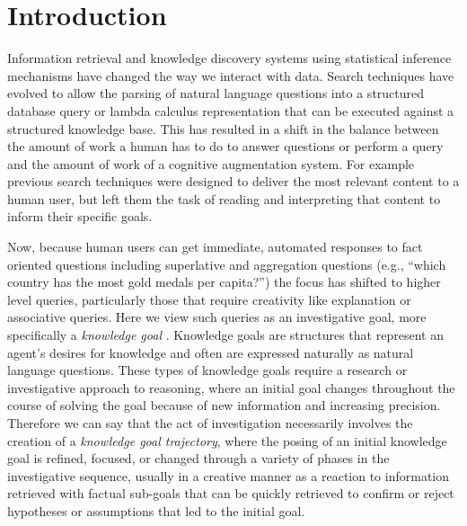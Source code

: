 \documentclass{llncs}
\begin{document}
\section{Introduction}
%
Information retrieval and knowledge discovery systems using statistical inference mechanisms have changed the way we interact with data. Search techniques have evolved to allow the parsing of natural language questions into a structured database query \cite{yahya_natural_2012} or lambda calculus representation \cite{berant_semantic_2013} that can be executed against a structured knowledge base. This has resulted in a shift in the balance between the amount of work a human has to do to answer questions or perform a query and the amount of work of a cognitive augmentation system. For example previous search techniques were designed to deliver the most relevant content to a human user, but left them the task of reading and interpreting that content to inform their specific goals.

	Now, because human users can get immediate, automated responses to fact oriented questions including superlative and aggregation questions (e.g., ``which country has the most gold medals per capita?'') the focus has shifted to higher level queries, particularly those that require creativity like explanation or associative queries. Here we view such queries as an investigative goal, more specifically a \textit{knowledge goal} \cite{bengfort_interactive_2015,ram_1990,ram_1991}. Knowledge goals are structures that represent an agent's desires for knowledge and often are expressed naturally as natural language questions. These types of knowledge goals require a research or investigative approach to reasoning, where an initial goal changes throughout the course of solving the goal because of new information and increasing precision. Therefore we can say that the act of investigation necessarily involves the creation of a \textit{knowledge goal trajectory}, where the posing of an initial knowledge goal is refined, focused, or changed through a variety of phases in the investigative sequence, usually in a creative manner as a reaction to information retrieved with factual sub-goals that can be quickly retrieved to confirm or reject hypotheses or assumptions that led to the initial goal.
\end{document}

